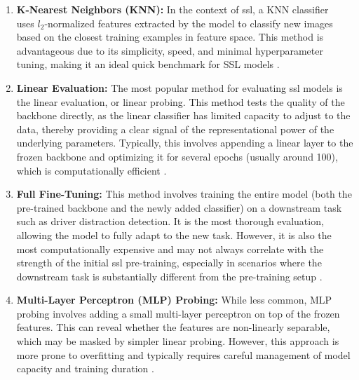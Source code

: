 \begin{enumerate}
    \item \textbf{K-Nearest Neighbors (KNN):}
    In the context of \gls{ssl}, a KNN classifier~\citep{kNN_Mucherino2009} uses $\displaystyle l_2$-normalized features extracted by the model to classify new images based on the closest training examples in feature space. This method is advantageous due to its simplicity, speed, and minimal hyperparameter tuning, making it an ideal quick benchmark for SSL models \citep{dino_caron2021emerging, ssl_codebook_balestriero2023cookbook}.

    \item \textbf{Linear Evaluation:}
    The most popular method for evaluating \gls{ssl} models is the linear evaluation, or linear probing. This method tests the quality of the backbone directly, as the linear classifier has limited capacity to adjust to the data, thereby providing a clear signal of the representational power of the underlying parameters. Typically, this involves appending a linear layer to the frozen backbone and optimizing it for several epochs (usually around 100), which is computationally efficient \citep{ssl_zhang_2016_colorful,ssl_zhang_2017split,ssl_codebook_balestriero2023cookbook,ssl_beit_bert_bao2021beit}.

    \item \textbf{Full Fine-Tuning:}
    This method involves training the entire model (both the pre-trained backbone and the newly added classifier) on a downstream task such as driver distraction detection. It is the most thorough evaluation, allowing the model to fully adapt to the new task. However, it is also the most computationally expensive and may not always correlate with the strength of the initial \gls{ssl} pre-training, especially in scenarios where the downstream task is substantially different from the pre-training setup \citep{masked_ae_he2021masked, ssl_codebook_balestriero2023cookbook}.

    \item \textbf{Multi-Layer Perceptron (MLP) Probing:}
    While less common, MLP probing involves adding a small multi-layer perceptron on top of the frozen features. This can reveal whether the features are non-linearly separable, which may be masked by simpler linear probing. However, this approach is more prone to overfitting and typically requires careful management of model capacity and training duration \citep{ssl_bordes2023towards, ssl_codebook_balestriero2023cookbook}.
\end{enumerate}
